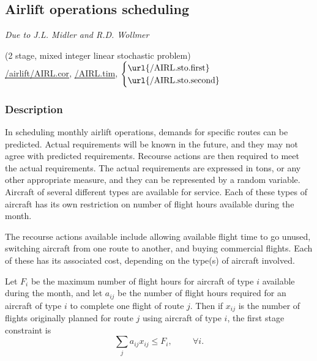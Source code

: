 \subsection{Airlift operations scheduling}%
\label{AIRLIFT}%
\emph{Due to J.L. Midler and R.D. Wollmer \cite{midler69}}%

\noindent(2 stage, mixed integer linear stochastic problem) \\
\noindent \url{/airlift}\url{/AIRL.cor}, \url{/AIRL.tim}, $\displaystyle \begin{cases} \text{\url{/AIRL.sto.first}}\\ \text{\url{/AIRL.sto.second}}\end{cases}$

\vspace{3mm}
\subsubsection{Description}

In scheduling monthly airlift operations, demands for specific routes can be predicted.  Actual requirements will be known in the future, and they may not agree with predicted requirements.  Recourse actions are then required to meet the actual requirements.  The actual requirements are expressed in tons, or any other appropriate measure, and they can be represented by a random variable.  Aircraft of several different types are available for service.  Each of these types of aircraft has its own restriction on number of flight hours available during the month.  

The recourse actions available include allowing available flight time to go unused, switching aircraft from one route to another, and buying commercial flights.  Each of these has its associated cost, depending on the type(s) of aircraft involved.

Let $F_i$ be the maximum number of flight hours for aircraft of type $i$ available during the month, and let $a_{ij}$ be the number of flight hours required for an aircraft of type $i$ to complete one flight of route $j$.  Then if $x_{ij}$ is the number of flights originally planned for route $j$ using aircraft of type $i$, the first stage constraint is
\begin{equation}
\label{AIRL:1}
\sum_j a_{ij}x_{ij} \leq F_i, \hspace{1cm} \forall i.
\end{equation}

